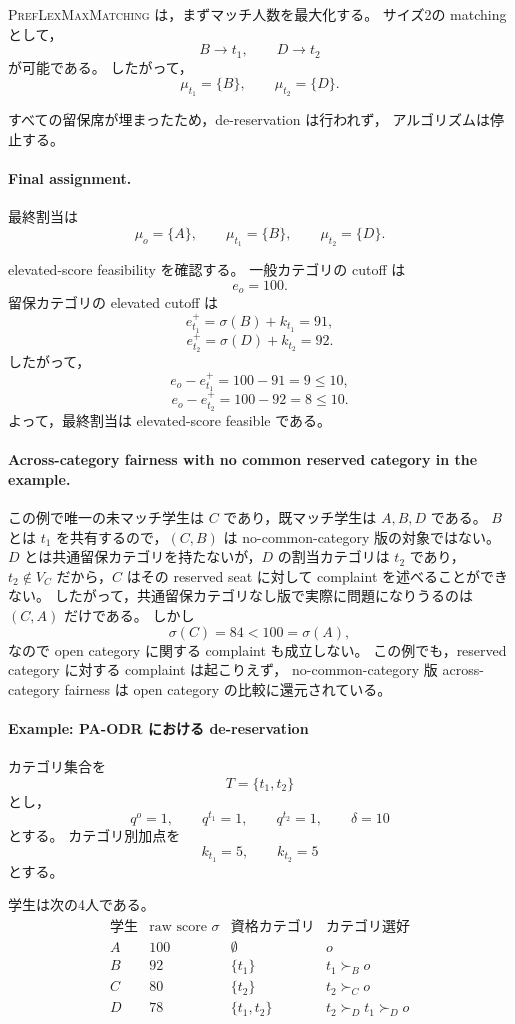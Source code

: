 \documentclass[
  12pt,
  a4paper,
  oneside,
  onecolumn,
  titlepage,
  final
]{jsarticle}
\newcommand{\1}{\mathbf{1}}
\begin{document}
\textsc{PrefLexMaxMatching} は，まずマッチ人数を最大化する。
サイズ2の matching として，
\[
    B\to t_1,
    \qquad
    D\to t_2
\]
が可能である。
したがって，
\[
    \mu_{t_1}=\{B\},
    \qquad
    \mu_{t_2}=\{D\}.
\]

すべての留保席が埋まったため，de-reservation は行われず，
アルゴリズムは停止する。

\paragraph{Final assignment.}
最終割当は
\[
    \mu_o=\{A\},
    \qquad
    \mu_{t_1}=\{B\},
    \qquad
    \mu_{t_2}=\{D\}.
\]

elevated-score feasibility を確認する。
一般カテゴリの cutoff は
\[
    e_o=100.
\]
留保カテゴリの elevated cutoff は
\[
    e_{t_1}^+=\sigma(B)+k_{t_1}=91,
\]
\[
    e_{t_2}^+=\sigma(D)+k_{t_2}=92.
\]
したがって，
\[
    e_o-e_{t_1}^+=100-91=9\le 10,
\]
\[
    e_o-e_{t_2}^+=100-92=8\le 10.
\]
よって，最終割当は elevated-score feasible である。

\paragraph{Across-category fairness with no common reserved category in the example.}
この例で唯一の未マッチ学生は $C$ であり，既マッチ学生は $A,B,D$ である。
$B$ とは $t_1$ を共有するので，$(C,B)$ は no-common-category 版の対象ではない。
$D$ とは共通留保カテゴリを持たないが，$D$ の割当カテゴリは $t_2$ であり，
$t_2\notin V_C$ だから，$C$ はその reserved seat に対して complaint を述べることができない。
したがって，共通留保カテゴリなし版で実際に問題になりうるのは $(C,A)$ だけである。
しかし
\[
    \sigma(C)=84<100=\sigma(A),
\]
なので open category に関する complaint も成立しない。
この例でも，reserved category に対する complaint は起こりえず，
no-common-category 版 across-category fairness は open category の比較に還元されている。

\paragraph{Example: PA-ODR における de-reservation}
\label{ex:pa-odr-dereservation}
カテゴリ集合を
\[
    T=\{t_1,t_2\}
\]
とし，
\[
    q^o=1,
    \qquad
    q^{t_1}=1,
    \qquad
    q^{t_2}=1,
    \qquad
    \delta=10
\]
とする。
カテゴリ別加点を
\[
    k_{t_1}=5,
    \qquad
    k_{t_2}=5
\]
とする。

学生は次の4人である。
\[
\begin{array}{c|c|c|c}
\text{学生} & \text{raw score } \sigma & \text{資格カテゴリ} & \text{カテゴリ選好} \\
\hline
A & 100 & \emptyset & o \\
B & 92  & \{t_1\} & t_1\succ_B o \\
C & 80  & \{t_2\} & t_2\succ_C o \\
D & 78  & \{t_1,t_2\} & t_2\succ_D t_1\succ_D o
\end{array}
\]
\end{document}

